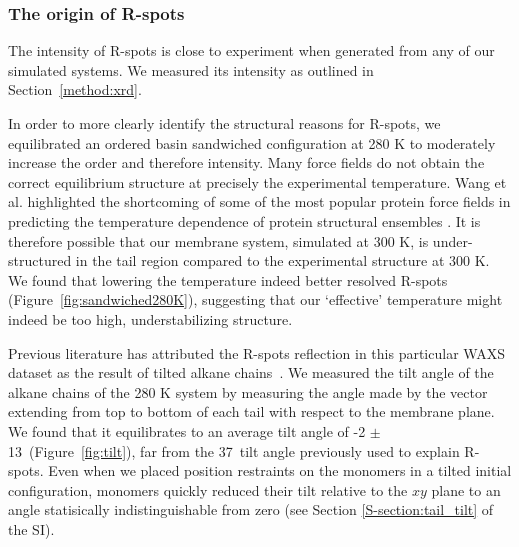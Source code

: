 \documentclass[journal=jpcbfk,manuscript=article]{achemso}
\begin{document}
  \subsubsection{The origin of R-spots}\label{section:rspots}
  
  The intensity of R-spots is close to experiment when generated from any of
  our simulated systems. We measured its intensity as outlined in Section~\ref{method:xrd}.

  In order to more clearly identify the structural reasons for R-spots, we
  equilibrated an ordered basin sandwiched configuration at 280 K to moderately
  increase the order and therefore intensity. Many force fields do not obtain
  the correct equilibrium structure at precisely the experimental temperature.
  Wang et al. highlighted the shortcoming of some of the most popular protein
  force fields in predicting the temperature dependence of protein structural
  ensembles \cite{wang_building_2017}. It is therefore possible that   %
  our membrane system, simulated at 300 K, is under-structured in the tail region
  compared to the experimental structure at 300 K. We found that lowering the
  temperature indeed better resolved R-spots (Figure~\ref{fig:sandwiched280K}),
  suggesting that our `effective' temperature might indeed be too high,
  understabilizing structure. 

  Previous literature has attributed the R-spots reflection in this particular
  WAXS dataset as the result of tilted alkane chains~\cite{feng_scalable_2014}.
  We measured the tilt angle of the alkane chains of the 280 K system by measuring
  the angle made by the vector extending from top to bottom of each tail with
  respect to the membrane plane. We found that it equilibrates to an average tilt
  angle of -2 $\pm$ 13\degree~(Figure~\ref{fig:tilt}), far from the 37\degree~tilt angle
  previously used to explain R-spots. Even when we placed position restraints on
  the monomers in a tilted initial configuration, monomers quickly reduced their
  tilt relative to the $xy$ plane to an angle statisically indistinguishable from
  zero (see Section \ref{S-section:tail_tilt} of the SI). 
\end{document}
